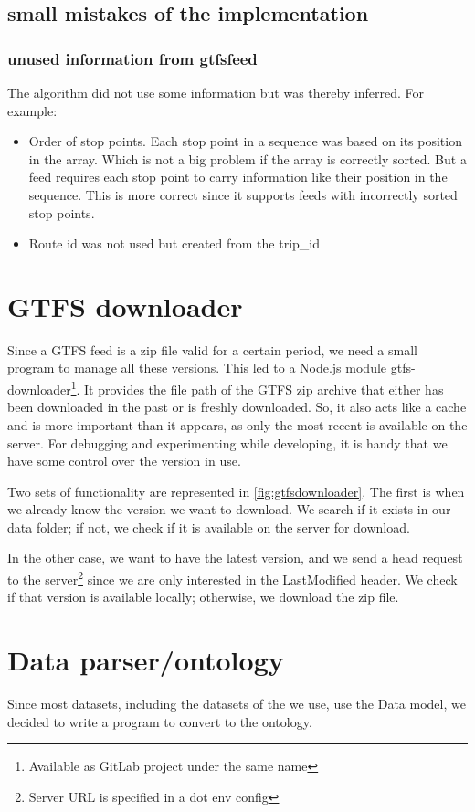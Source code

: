 \subsection{small mistakes of the implementation}
\subsubsection{unused information from gtfsfeed}
The algorithm did not use some information but was thereby inferred. For example:
\begin{itemize}
    \item Order of stop points. Each stop point in a sequence was based on its position in the array. Which is not a big problem if the array is correctly sorted. But a  feed requires each stop point to carry information like their position in the sequence. This is more correct since it supports feeds with incorrectly sorted stop points.
    \item Route id was not used but created from the trip\_id 
\end{itemize}
\section{GTFS downloader}
Since a GTFS feed is a zip file valid for a certain period, we need a small program to manage all these versions. This led to a Node.js module gtfs-downloader\footnote{Available as GitLab project under the same name}. It provides the file path of the GTFS zip archive that either has been downloaded in the past or is freshly downloaded. So, it also acts like a cache and is more important than it appears, as only the most recent is available on the server. For debugging and experimenting while developing, it is handy that we have some control over the version in use. 

Two sets of functionality are represented in \autoref{fig:gtfsdownloader}. The first is when we already know the version we want to download. We search if it exists in our data folder; if not, we check if it is available on the server for download.

In the other case, we want to have the latest version, and we send a head request to the server\footnote{Server URL is specified in a dot env config} since we are only interested in the LastModified header. We check if that version is available locally; otherwise, we download the zip file.

\section{Data parser/ontology}\label{section:implementation_data_ontology}
Since most datasets, including the datasets of the  we use, use the  Data model, we decided to write a program to convert  to the  ontology.
